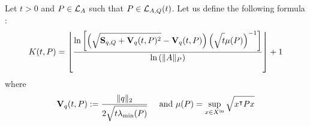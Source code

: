 \documentclass[10pt]{article}
\begin{document}
Let $t>0$ and $P\in\mathcal{L}_{A}$ such that $P\in \mathcal{L}_{A,Q}(t)$. Let us define the following formula :
\begin{equation}
\label{intgfond}
K(t,P)=\left\lfloor \dfrac{\ln\left[\left(\sqrt{\strut \mathbf{S}_{q,Q}+\mathbf{V}_{q}(t,P)^2}-\mathbf{V}_{q}(t,P)\right)\left(\sqrt{\strut t}\mu(P)\right)^{-1}\right]}{\ln\left(\| A\|_P\right)}\right\rfloor+1
\end{equation}
where 
\[
\mathbf{V}_{q}(t,P):=\dfrac{\| q\|_2 }{2\sqrt{\strut t\lambda_{\operatorname{min}}(P)}}\quad \text{ and } \mu(P)=\sup_{x\in X^\mathrm{in}} \sqrt{\strut x^\intercal P x}
\]
\begin{comment}
\begin{equation}
K_t=\left\lfloor \dfrac{\ln\left(\mu(Q)^2\left(t\mu(P)^{2}+\mu(P)\lambda_d(P)^{-1/2}\norm{q}_2\right)^{-1}\right)}{\ln\left(\norm{A}_P\right)}\right\rfloor+1
\end{equation}

\begin{equation}
K_t=\left\lfloor \dfrac{\ln\left(\left[L+4\norm{q}_2^2\lmin{P}^{-1}t^{-2}\mu(P)^{-1}\right]^{1/2}-
\left(2t^{-1}\mu(P)^{1/2}\lmin{P}^{-1/2}\norm{q}_2\right)\right)}{\ln\left(\norm{A}_P\right)}\right\rfloor+1
\end{equation}

Let $P\in\lyap{A}$. We define the following formula :
\begin{equation}
K_0=\left\lfloor \dfrac{\ln\left(\mu(Q)^2\left(\lmin{P}^{-1}\lmax{Q}\mu(P)^{2}+\mu(P)\lambda_d(P)^{-1/2}\norm{q}_2\right)^{-1}\right)}{\ln\left(\norm{A}_P\right)}\right\rfloor+1
\end{equation}

\begin{equation}
K_\infty=\left\lfloor \dfrac{\ln\left(\mu(Q)^2\left(\lmax{P^{-1/2} Q P^{-1/2}}\mu(P)^{2}+\mu(P)\lambda_d(P)^{-1/2}\norm{q}_2\right)^{-1}\right)}{\ln\left(\norm{A}_P\right)}\right\rfloor+1
\end{equation}

\begin{comment}
Let write hypothesis:
\begin{equation}
\label{hypo1}
P\succ 0,\ \lambda_1(Q) P- Q\succeq 0,\ P-A^\intercal P A\succ 0
\end{equation}

\begin{equation}
\kappa_1(P):=\ln\left(\alpha(Q,\xin) \alpha(P,\xin)^{-1}\lambda_1(Q)^{-1}\right) \left(\ln(\norm{A}_P^2)\right)^{-1}
\end{equation}

\begin{equation}
\label{hypo2}
P\succ 0,\ P-A^\intercal P A\succ 0
\end{equation}

\begin{equation}
\kappa_2(P):=\log\left(\alpha(Q,\xin) \alpha(P,\xin)^{-1}\lambda_{d}(P)\lambda_1(Q)^{-1}\right) \left(\log(\norm{A}_P^2)\right)^{-1}
\end{equation}
\end{comment}
\end{document}
